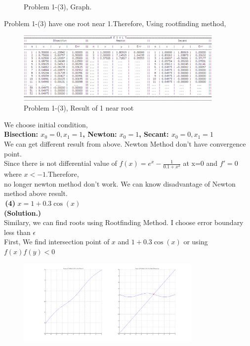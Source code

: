 \documentclass[10pt]{article}
\begin{document}
\begin{flushleft}
\begin{figure}[!h]
\begin{center}
		\caption{Problem 1-(3), Graph.}
		\end{center}
	\end{figure}
	\qquad \quad Problem 1-(3) have one root near 1.Therefore, Using rootfinding method,\\
	\begin{figure}[!h]
		\centering
		\begin{center}
		\includegraphics[width=0.9\textwidth]{1-3-r.png}
		\caption{Problem 1-(3), Result of 1 near root }
		\end{center}
	\end{figure}
	\qquad \quad We choose initial condition,\\
	\qquad \qquad \qquad \qquad \qquad \textbf{Bisection: $x_0=0,x_1=1$, Newton: $x_0=1$, Secant: $x_0=0,x_1=1$}\\
	\qquad \quad We can get different result from above. Newton Method don't have convergence point.\\
	\qquad \quad Since there is not differential value of $f(x)=e^x-\frac{1}{0.1+x^2}$ at x=0 and $f'=0$ where $x<-1$.Therefore, \\
	\qquad \quad no longer newton method don't work. We can know disadvantage of Newton method above result.\\
 	\;\;\;\;\newpage
 	\quad\,\textbf{(4)} $x=1+0.3\cos(x)$\\
 	\;\;\;
	\qquad \quad \textbf{(Solution.)} \\
	\qquad \quad Similary, we can find roots using Rootfinding Method. I choose error boundary less than $\epsilon$\\ 
	\qquad \quad First, We find intersection point of $x$ and $1+0.3\cos(x)$ or using $f(x)f(y)<0$\\
	\begin{figure}[!h]
		\centering
		\begin{center}
		\includegraphics[width=0.8\textwidth]{1-1-4.png}

\end{center}
\end{figure}
\end{flushleft}
\end{document}
